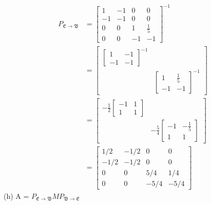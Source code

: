 \documentclass{report}
\begin{document}
$$
\begin{aligned}
P_{\mathfrak{E}\rightarrow\mathfrak{B}} &=\begin{bmatrix}
1&-1&0&0\\
-1&-1&0&0\\
0&0&1&\frac{1}{5}\\
0&0&-1&-1
\end{bmatrix}^{-1} \\
&=\begin{bmatrix}
\begin{bmatrix}1&-1\\-1&-1\end{bmatrix}^{-1}&\\
&\begin{bmatrix}1&\frac{1}{5}\\-1&-1\end{bmatrix}^{-1}
\end{bmatrix}\\
&=\begin{bmatrix}
-\frac{1}{2}\begin{bmatrix}-1&1\\1&1\end{bmatrix}&\\
&-\frac{5}{4}\begin{bmatrix}-1&-\frac{1}{5}\\1&1\end{bmatrix}
\end{bmatrix}\\
&=\begin{bmatrix}
1/2&-1/2&0&0\\
-1/2&-1/2&0&0\\
0&0&5/4&1/4\\
0&0&-5/4&-5/4
\end{bmatrix}
\end{aligned}
$$
(h) A = $P_{\mathfrak{E}\rightarrow\mathfrak{B}}MP_{\mathfrak{B}\rightarrow\mathfrak{E}}$
\end{document}
